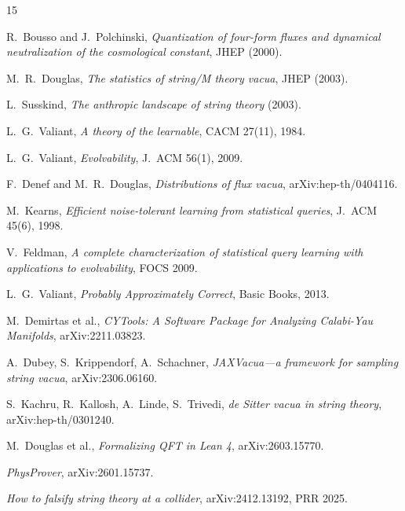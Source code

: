 \documentclass[11pt]{article}
\begin{document}
\begin{thebibliography}{15}

 R.~Bousso and J.~Polchinski,
\emph{Quantization of four-form fluxes and dynamical neutralization of the cosmological
constant}, JHEP (2000).

 M.~R.~Douglas,
\emph{The statistics of string/M theory vacua}, JHEP (2003).

 L.~Susskind,
\emph{The anthropic landscape of string theory} (2003).

 L.~G.~Valiant,
\emph{A theory of the learnable}, CACM 27(11), 1984.

 L.~G.~Valiant,
\emph{Evolvability}, J.~ACM 56(1), 2009.

 F.~Denef and M.~R.~Douglas,
\emph{Distributions of flux vacua}, arXiv:hep-th/0404116.

 M.~Kearns,
\emph{Efficient noise-tolerant learning from statistical queries}, J.~ACM 45(6), 1998.

 V.~Feldman,
\emph{A complete characterization of statistical query learning with applications to
evolvability}, FOCS 2009.

 L.~G.~Valiant,
\emph{Probably Approximately Correct}, Basic Books, 2013.

 M.~Demirtas et al.,
\emph{CYTools: A Software Package for Analyzing Calabi-Yau Manifolds}, arXiv:2211.03823.

 A.~Dubey, S.~Krippendorf, A.~Schachner,
\emph{JAXVacua---a framework for sampling string vacua}, arXiv:2306.06160.

 S.~Kachru, R.~Kallosh, A.~Linde, S.~Trivedi,
\emph{de Sitter vacua in string theory}, arXiv:hep-th/0301240.

 M.~Douglas et al.,
\emph{Formalizing QFT in Lean 4}, arXiv:2603.15770.

\emph{PhysProver}, arXiv:2601.15737.

\emph{How to falsify string theory at a collider}, arXiv:2412.13192, PRR 2025.

\end{thebibliography}
\end{document}

